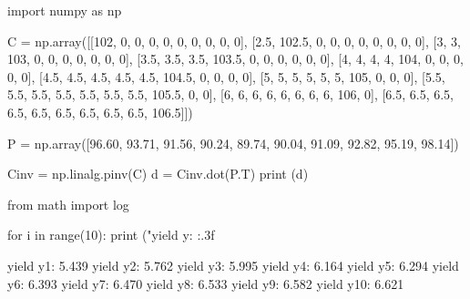 \cprotEnv\begin{solution}
\begin{ipython}
import numpy as np

C = np.array([[102, 0, 0, 0, 0, 0, 0, 0, 0, 0],
              [2.5, 102.5, 0, 0, 0, 0, 0, 0, 0, 0],
              [3, 3, 103, 0, 0, 0, 0, 0, 0, 0],
              [3.5, 3.5, 3.5, 103.5, 0, 0, 0, 0, 0, 0],
              [4, 4, 4, 4, 104, 0, 0, 0, 0, 0],
              [4.5, 4.5, 4.5, 4.5, 4.5, 104.5, 0, 0, 0, 0],
              [5, 5, 5, 5, 5, 5, 105, 0, 0, 0],
              [5.5, 5.5, 5.5, 5.5, 5.5, 5.5, 5.5, 105.5, 0, 0],
              [6, 6, 6, 6, 6, 6, 6, 6, 106, 0],
              [6.5, 6.5, 6.5, 6.5, 6.5, 6.5, 6.5, 6.5, 6.5, 106.5]])

P = np.array([96.60, 93.71, 91.56, 90.24, 89.74, 
              90.04, 91.09, 92.82, 95.19, 98.14])

Cinv = np.linalg.pinv(C)
d = Cinv.dot(P.T)
print (d)
\end{ipython}
\begin{ioutput}
[0.94705882 0.89114491 0.83539212 0.7814726  0.72999737 0.68140865
 0.63578693 0.59296268 0.55300618 0.51574181]
\end{ioutput}

\begin{ipython}
from math import log

for i in range(10):
    print ("yield y{}: {:.3f}%
\end{ipython}
\begin{ioutput}
yield y1: 5.439%
yield y2: 5.762%
yield y3: 5.995%
yield y4: 6.164%
yield y5: 6.294%
yield y6: 6.393%
yield y7: 6.470%
yield y8: 6.533%
yield y9: 6.582%
yield y10: 6.621%
\end{ioutput}
\end{solution}

